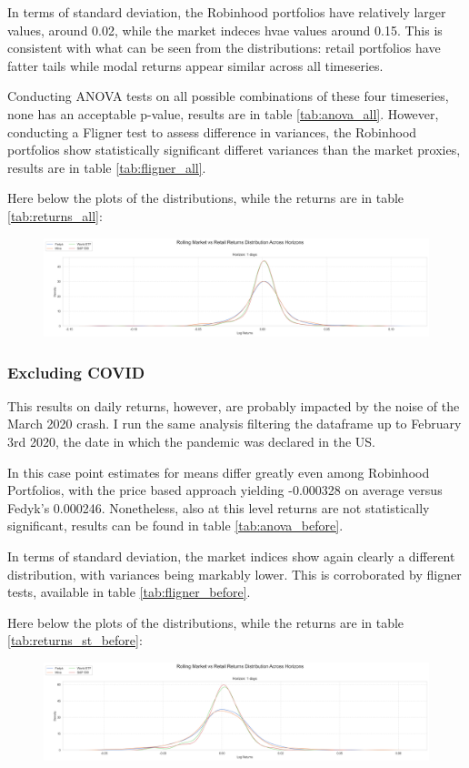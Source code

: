 In terms of standard deviation, the Robinhood portfolios have relatively larger values, around 0.02, while the market indeces hvae values around 0.15. 
This is consistent with what can be seen from the distributions: retail portfolios have fatter tails while modal returns appear similar across all timeseries.

Conducting ANOVA tests on all possible combinations of these four timeseries, none has an acceptable p-value, results are in table \ref{tab:anova_all}.
However, conducting a Fligner test to assess difference in variances, the Robinhood portfolios show statistically significant differet variances than the market proxies, results are in table \ref{tab:fligner_all}.


Here below the plots of the distributions, while the returns are in table \ref{tab:returns_all}:
\begin{figure}[h!]
    \centering
    \includegraphics[width=1\linewidth]
    {../images/distributions/st_all.png}
\end{figure}


\subsubsection{Excluding COVID}
This results on daily returns, however, are probably impacted by the noise of the March 2020 crash. 
I run the same analysis filtering the dataframe up to February 3rd 2020, the date in which the pandemic was declared in the US.

In this case point estimates for means differ greatly even among Robinhood Portfolios, with the price based approach yielding -0.000328 on average versus Fedyk's 0.000246.
Nonetheless, also at this level returns are not statistically significant, results can be found in table \ref{tab:anova_before}.

In terms of standard deviation, the market indices show again clearly a different distribution, with variances being markably lower. 
This is corroborated by fligner tests, available in table \ref{tab:fligner_before}.

Here below the plots of the distributions, while the returns are in table \ref{tab:returns_st_before}:
\begin{figure}[H]
    \centering
    \includegraphics[width=1\linewidth]
    {../images/distributions/st_before.png}
\end{figure}

